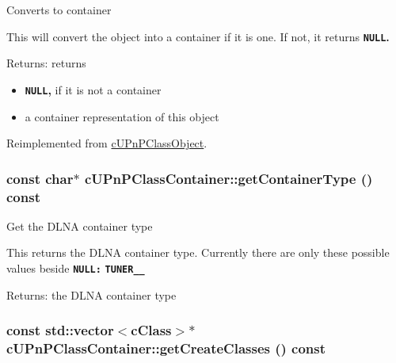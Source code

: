 Converts to container

This will convert the object into a container if it is one. If not, it returns {\bf {\tt NULL}.} 

\begin{Desc}
\item[Returns:]returns\begin{itemize}
\item {\bf {\tt NULL},} if it is not a container\item a container representation of this object \end{itemize}
\end{Desc}


Reimplemented from \hyperlink{classcUPnPClassObject_ce6f39a8484ae48ea9801b11046cd2a6}{cUPnPClassObject}.\hypertarget{classcUPnPClassContainer_b4977eba812c34a4201935f31be0f5c9}{
\subsubsection[{getContainerType}]{\setlength{\rightskip}{0pt plus 5cm}const char$\ast$ cUPnPClassContainer::getContainerType () const}}
\label{classcUPnPClassContainer_b4977eba812c34a4201935f31be0f5c9}


Get the DLNA container type

This returns the DLNA container type. Currently there are only these possible values beside {\bf {\tt NULL:} } {\bf {\tt TUNER\_\_}  } \begin{Desc}
\item[Returns:]the DLNA container type \end{Desc}
\hypertarget{classcUPnPClassContainer_d9a875daad1093311723262f5f6c1f7c}{
\subsubsection[{getCreateClasses}]{\setlength{\rightskip}{0pt plus 5cm}const std::vector$<${\bf cClass}$>$$\ast$ cUPnPClassContainer::getCreateClasses () const}}
\label{classcUPnPClassContainer_d9a875daad1093311723262f5f6c1f7c}


